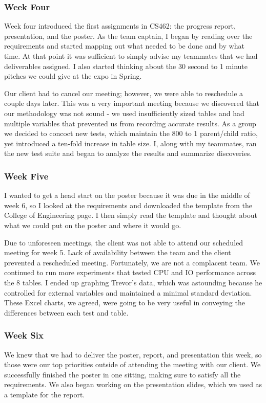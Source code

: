 \documentclass[10pt]{article}
\begin{document}
\subsubsection{Week Four}
Week four introduced the first assignments in CS462: the progress report, presentation, and the poster. As the team captain, I began by reading over the requirements and started mapping out what needed to be done and by what time. At that point it was sufficient to simply advise my teammates that we had deliverables assigned. I also started thinking about the 30 second to 1 minute pitches we could give at the expo in Spring. 

Our client had to cancel our meeting; however, we were able to reschedule a couple days later. This was a very important meeting because we discovered that our methodology was not sound - we used insufficiently sized tables and had multiple variables that prevented us from recording accurate results. As a group we decided to concoct new tests, which maintain the 800 to 1 parent/child ratio, yet introduced a ten-fold increase in table size. I, along with my teammates, ran the new test suite and began to analyze the results and summarize discoveries. 

\subsubsection{Week Five}
I wanted to get a head start on the poster because it was due in the middle of week 6, so I looked at the requirements and downloaded the template from the College of Engineering page. I then simply read the template and thought about what we could put on the poster and where it would go.

Due to unforeseen meetings, the client was not able to attend our scheduled meeting for week 5. Lack of availability between the team and the client prevented a rescheduled meeting. Fortunately, we are not a complacent team. We continued to run more experiments that tested CPU and IO performance across the 8 tables. I ended up graphing Trevor's data, which was astounding because he controlled for external variables and maintained a minimal standard deviation. These Excel charts, we agreed, were going to be very useful in conveying the differences between each test and table. 

\subsubsection{Week Six}
We knew that we had to deliver the poster, report, and presentation this week, so those were our top priorities outside of attending the meeting with our client. We successfully finished the poster in one sitting, making sure to satisfy all the requirements. We also began working on the presentation slides, which we used as a template for the report.
\end{document}
